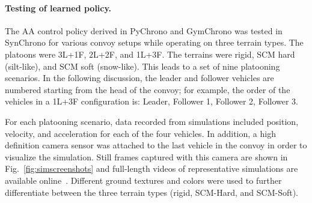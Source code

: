 \documentclass[12pt,twocolumn]{article}
\begin{document}
\paragraph{Testing of learned policy.}  The AA control policy derived in PyChrono and GymChrono was tested in SynChrono for various convoy setups while operating on three terrain types. The platoons were 3L+1F, 2L+2F, and 1L+3F. The terrains were rigid, SCM hard (silt-like), and SCM soft (snow-like). This leads to a set of nine platooning scenarios. In the following discussion, the leader and follower vehicles are numbered starting from the head of the convoy; for example, the order of the vehicles in a 1L+3F configuration is: Leader, Follower 1, Follower 2, Follower 3.

For each platooning scenario, data recorded from simulations included position, velocity, and acceleration for each of the four vehicles. In addition, a high definition camera sensor was attached to the last vehicle in the convoy in order to visualize the simulation. Still frames captured with this camera are shown in Fig.~\ref{fig:simscreenshots} and full-length videos of representative simulations are available online~\cite{simsPaperGVSETS2020}. Different ground textures and colors were used to further differentiate between the three terrain types (rigid, SCM-Hard, and SCM-Soft).
%
\end{document}
